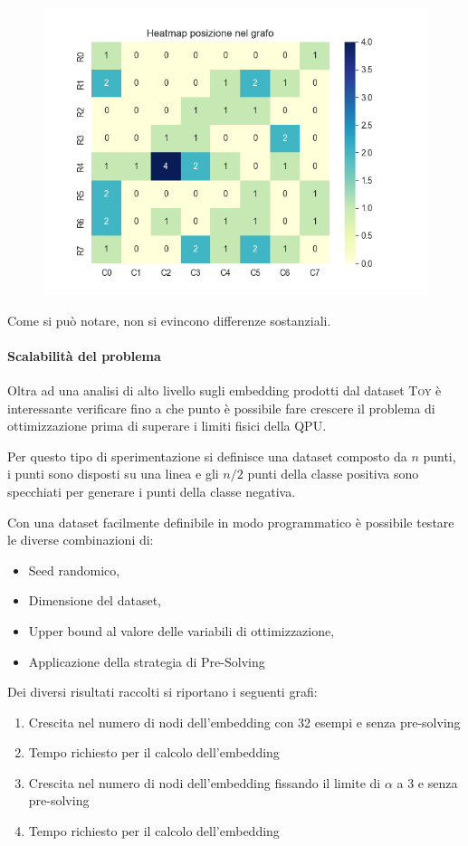\documentclass[12pt]{article}
\begin{document}
\begin{figure}[H]
  \centering
  \includegraphics[width=\linewidth]{img/heatmap.png}
\end{figure}

Come si può notare, non si evincono differenze sostanziali.

\paragraph{Scalabilità del problema}
Oltra ad una analisi di alto livello sugli embedding prodotti dal dataset \textsc{Toy} è interessante verificare fino a che punto è possibile fare crescere il problema di ottimizzazione prima di superare i limiti fisici della QPU.

Per questo tipo di sperimentazione si definisce una dataset composto da $n$ punti, i punti sono disposti su una linea e gli $n/2$ punti della classe positiva sono specchiati per generare i punti della classe negativa.

Con una dataset facilmente definibile in modo programmatico è possibile testare le diverse combinazioni di: 
\begin{itemize}
  \item Seed randomico,
  \item Dimensione del dataset,
  \item Upper bound al valore delle variabili di ottimizzazione,
  \item Applicazione della strategia di Pre-Solving 
\end{itemize}

Dei diversi risultati raccolti si riportano i seguenti grafi:
\begin{enumerate}
  \item Crescita nel numero di nodi dell'embedding con 32 esempi e senza pre-solving
  \item Tempo richiesto per il calcolo dell'embedding
  \item Crescita nel numero di nodi dell'embedding fissando il limite di $\alpha$ a 3 e senza pre-solving
  \item Tempo richiesto per il calcolo dell'embedding
\end{enumerate}
\end{document}
